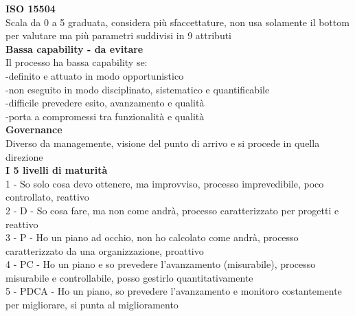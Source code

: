 \documentclass{article}
\begin{document}
		\textbf{ISO 15504}\\
		Scala da 0 a 5 graduata, considera più sfaccettature, non usa solamente il bottom per valutare ma più parametri suddivisi in 9 attributi\\
		
		\textbf{Bassa capability - da evitare}\\
		Il processo ha bassa capability se:\\
		-definito e attuato in modo opportunistico\\
		-non eseguito in modo disciplinato, sistematico e quantificabile\\
		-difficile prevedere esito, avanzamento e qualità\\
		-porta a compromessi tra funzionalità e qualità\\
		
		\textbf{Governance}\\
		Diverso da managemente, visione del punto di arrivo e si procede in quella direzione\\
		
		\textbf{I 5 livelli di maturità}\\
		1 - So solo cosa devo ottenere, ma improvviso, processo imprevedibile, poco controllato, reattivo\\
		2 - D - So cosa fare, ma non come andrà, processo caratterizzato per progetti e reattivo\\
		3 - P - Ho un piano ad occhio, non ho calcolato come andrà, processo caratterizzato da una organizzazione, proattivo\\
		4 - PC - Ho un piano e so prevedere l'avanzamento (misurabile), processo misurabile e controllabile, posso gestirlo quantitativamente\\
		5 - PDCA - Ho un piano, so prevedere l'avanzamento e monitoro costantemente per migliorare, si punta al miglioramento\\
		
\end{document}
